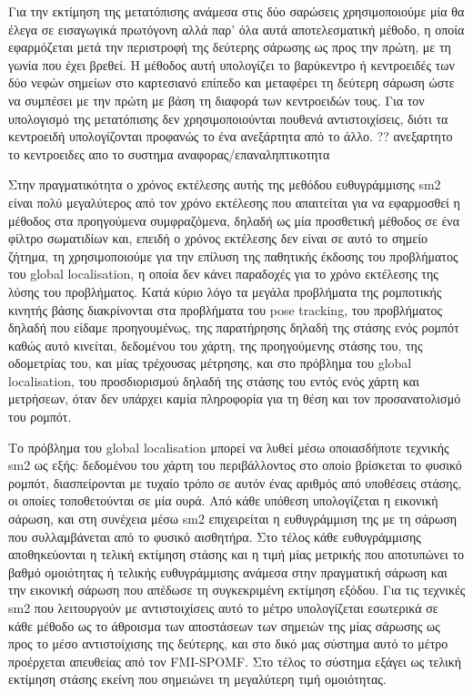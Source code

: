 \documentclass[a4paper,10pt]{article}
\begin{document}
Για την εκτίμηση της μετατόπισης ανάμεσα στις δύο σαρώσεις χρησιμοποιούμε μία
θα έλεγα σε εισαγωγικά πρωτόγονη αλλά παρ' όλα αυτά αποτελεσματική μέθοδο, η
οποία εφαρμόζεται μετά την περιστροφή της δεύτερης σάρωσης ως προς την πρώτη,
με τη γωνία που έχει βρεθεί. Η μέθοδος αυτή υπολογίζει το βαρύκεντρο ή
κεντροειδές των δύο νεφών σημείων στο καρτεσιανό επίπεδο και μεταφέρει τη
δεύτερη σάρωση ώστε να συμπέσει με την πρώτη με βάση τη διαφορά των κεντροειδών
τους. Για τον υπολογισμό της μετατόπισης δεν χρησιμοποιούνται πουθενά
αντιστοιχίσεις, διότι τα κεντροειδή υπολογίζονται προφανώς το ένα ανεξάρτητα
από το άλλο.  ?? ανεξαρτητο το κεντροειδες απο το συστημα
αναφορας/επαναληπτικοτητα

Στην πραγματικότητα ο χρόνος εκτέλεσης αυτής της μεθόδου ευθυγράμμισης sm2
είναι πολύ μεγαλύτερος από τον χρόνο εκτέλεσης που απαιτείται για να εφαρμοσθεί
η μέθοδος στα προηγούμενα συμφραζόμενα, δηλαδή ως μία προσθετική μέθοδος σε ένα
φίλτρο σωματιδίων και, επειδή ο χρόνος εκτέλεσης δεν είναι σε αυτό το σημείο
ζήτημα, τη χρησιμοποιούμε για την επίλυση της παθητικής έκδοσης του προβλήματος
του global localisation, η οποία δεν κάνει παραδοχές για το χρόνο εκτέλεσης της
λύσης του προβλήματος.
Κατά κύριο λόγο τα μεγάλα προβλήματα της ρομποτικής κινητής βάσης διακρίνονται
στα προβλήματα του pose tracking, του προβλήματος δηλαδή που είδαμε
προηγουμένως, της παρατήρησης δηλαδή της στάσης ενός ρομπότ καθώς αυτό
κινείται, δεδομένου του χάρτη, της προηγούμενης στάσης του, της οδομετρίας του,
και μίας τρέχουσας μέτρησης, και στο πρόβλημα του global localisation, του
προσδιορισμού δηλαδή της στάσης του εντός ενός χάρτη και μετρήσεων, όταν δεν
υπάρχει καμία πληροφορία για τη θέση και τον προσανατολισμό του ρομπότ.

Το πρόβλημα του global localisation μπορεί να λυθεί μέσω οποιασδήποτε τεχνικής
sm2 ως εξής: δεδομένου του χάρτη του περιβάλλοντος στο οποίο βρίσκεται το
φυσικό ρομπότ, διασπείρονται με τυχαίο τρόπο σε αυτόν ένας αριθμός από
υποθέσεις στάσης, οι οποίες τοποθετούνται σε μία ουρά. Από κάθε υπόθεση
υπολογίζεται η εικονική σάρωση, και στη συνέχεια μέσω sm2 επιχειρείται η
ευθυγράμμιση της με τη σάρωση που συλλαμβάνεται από το φυσικό αισθητήρα. Στο
τέλος κάθε ευθυγράμμισης αποθηκεύονται η τελική εκτίμηση στάσης και η τιμή μίας
μετρικής που αποτυπώνει το βαθμό ομοιότητας ή τελικής ευθυγράμμισης ανάμεσα
στην πραγματική σάρωση και την εικονική σάρωση που απέδωσε τη συγκεκριμένη
εκτίμηση εξόδου.  Για τις τεχνικές sm2 που λειτουργούν με αντιστοιχίσεις αυτό
το μέτρο υπολογίζεται εσωτερικά σε κάθε μέθοδο ως το άθροισμα των αποστάσεων
των σημειών της μίας σάρωσης ως προς το μέσο αντιστοίχισης της δεύτερης, και
στο δικό μας σύστημα αυτό το μέτρο προέρχεται απευθείας από τον FMI-SPOMF. Στο
τέλος το σύστημα εξάγει ως τελική εκτίμηση στάσης εκείνη που σημειώνει τη
μεγαλύτερη τιμή ομοιότητας.
\end{document}
